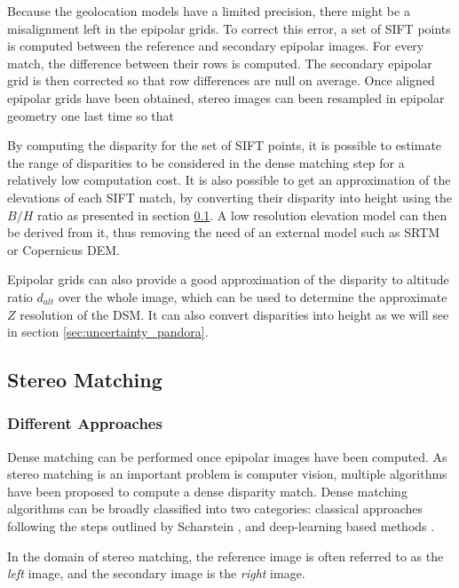 Because the geolocation models have a limited precision, there might be a misalignment left in the epipolar grids. To correct this error, a set of SIFT points \cite{lowe_distinctive_2004} is computed between the reference and secondary epipolar images. For every match, the difference between their rows is computed. The secondary epipolar grid is then corrected so that row differences are null on average. Once aligned epipolar grids have been obtained, stereo images can been resampled in epipolar geometry one last time so that 

\begin{remark}
    By computing the disparity for the set of SIFT points, it is possible to estimate the range of disparities to be considered in the dense matching step for a relatively low computation cost. It is also possible to get an approximation of the elevations of each SIFT match, by converting their disparity into height using the $B/H$ ratio as presented in section \ref{sec:stereo_matching}. A low resolution elevation model can then be derived from it, thus removing the need of an external model such as SRTM or Copernicus DEM.
\end{remark} 

Epipolar grids can also provide a good approximation of the disparity to altitude ratio $d_{alt}$ over the whole image, which can be used to determine the approximate $Z$ resolution of the DSM. It can also convert disparities into height as we will see in section \ref{sec:uncertainty_pandora}. 

\subsection{Stereo Matching}\label{sec:stereo_matching}
\subsubsection{Different Approaches}
Dense matching can be performed once epipolar images have been computed. As stereo matching is an important problem is computer vision, multiple algorithms have been proposed to compute a dense disparity match. Dense matching algorithms can be broadly classified into two categories: classical approaches following the steps outlined by Scharstein \etal \cite{scharstein_taxonomy_2001}, and deep-learning based methods \cite{laga_survey_2022}.
\begin{remark}
	In the domain of stereo matching, the reference image is often referred to as the \textit{left} image, and the secondary image is the \textit{right} image.
\end{remark}

